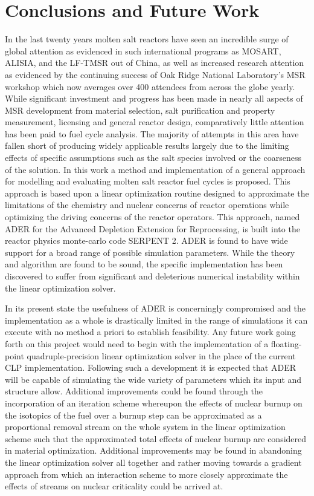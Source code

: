 \chapter{Conclusions and Future Work}
\label{ch:conc}

In the last twenty years molten salt reactors have seen an incredible surge of
global attention as evidenced in such international programs as MOSART, ALISIA,
and the LF-TMSR out of China, as well as increased research attention as
evidenced by the continuing success of Oak Ridge National Laboratory's MSR
workshop which now averages over 400 attendees from across the globe yearly. 
While significant investment and progress has been made in nearly all aspects
of MSR development from material selection, salt purification and property
measurement, licensing and general reactor design, comparatively little
attention has been paid to fuel cycle analysis. The majority of attempts in
this area have fallen short of producing widely applicable results largely due
to the limiting effects of specific assumptions such as the salt species
involved or the coarseness of the solution. In this work a method and
implementation of a general approach for modelling and evaluating molten salt
reactor fuel cycles is proposed. This approach is based upon a linear
optimization routine designed to approximate the limitations of the chemistry
and nuclear concerns of reactor operations while optimizing the driving concerns
of the reactor operators. This approach, named ADER for the Advanced Depletion
Extension for Reprocessing, is built into the reactor physics monte-carlo code
SERPENT 2. ADER is found to have wide support for a broad range of possible
simulation parameters.
While the theory and algorithm are found to be
sound, the specific implementation has been discovered to suffer from
significant and deleterious numerical instability within the 
linear optimization solver.

In its present state the usefulness of ADER is concerningly compromised and
the implementation as a whole is drastically limited in the range of simulations
it can execute with no method a priori to establish feasibility. Any future
work going forth on this project would need to begin with the implementation
of a floating-point quadruple-precision linear optimization solver in the place
of the current CLP implementation. Following such a development it is expected
that ADER will be capable of simulating the wide variety of parameters which its
input and structure allow. Additional improvements could be found through the
incorporation of an iteration scheme whereupon the effects of nuclear burnup
on the isotopics of the fuel over a burnup step can be approximated as a
proportional removal stream on the whole system in the linear optimization
scheme such that the approximated total effects of nuclear burnup are considered
in material optimization. Additional improvements may be found in abandoning the
linear optimization solver all together and rather moving towards a gradient
approach from which an interaction scheme to more closely approximate the 
effects of streams on nuclear criticality could be arrived at. 

